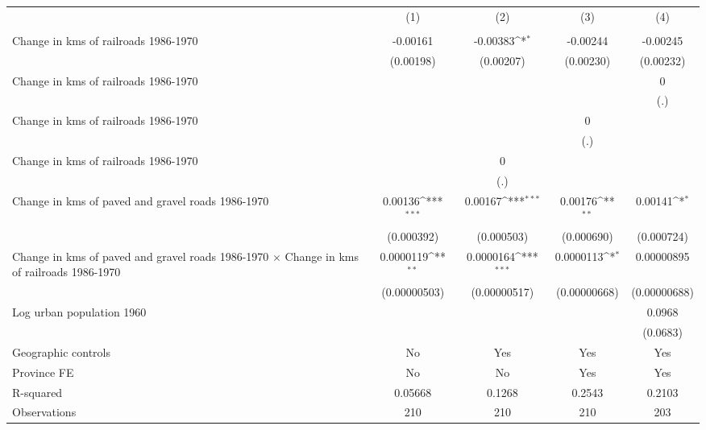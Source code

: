 {
\def\sym#1{\ifmmode^{#1}\else\(^{#1}\)\fi}
\begin{tabular}{l*{4}{c}}
\hline\hline
                &\multicolumn{1}{c}{(1)}&\multicolumn{1}{c}{(2)}&\multicolumn{1}{c}{(3)}&\multicolumn{1}{c}{(4)}\\
                &\multicolumn{1}{c}{}&\multicolumn{1}{c}{}&\multicolumn{1}{c}{}&\multicolumn{1}{c}{}\\
\hline
Change in kms of railroads 1986-1970& -0.00161         & -0.00383\sym{*}  & -0.00244         & -0.00245         \\
                &(0.00198)         &(0.00207)         &(0.00230)         &(0.00232)         \\
[1em]
Change in kms of railroads 1986-1970&                  &                  &                  &        0         \\
                &                  &                  &                  &      (.)         \\
[1em]
Change in kms of railroads 1986-1970&                  &                  &        0         &                  \\
                &                  &                  &      (.)         &                  \\
[1em]
Change in kms of railroads 1986-1970&                  &        0         &                  &                  \\
                &                  &      (.)         &                  &                  \\
[1em]
Change in kms of paved and gravel roads 1986-1970&  0.00136\sym{***}&  0.00167\sym{***}&  0.00176\sym{**} &  0.00141\sym{*}  \\
                &(0.000392)         &(0.000503)         &(0.000690)         &(0.000724)         \\
[1em]
Change in kms of paved and gravel roads 1986-1970 $\times$ Change in kms of railroads 1986-1970&0.0000119\sym{**} &0.0000164\sym{***}&0.0000113\sym{*}  &0.00000895         \\
                &(0.00000503)         &(0.00000517)         &(0.00000668)         &(0.00000688)         \\
[1em]
Log urban population 1960&                  &                  &                  &   0.0968         \\
                &                  &                  &                  & (0.0683)         \\
\hline
Geographic controls&       No         &      Yes         &      Yes         &      Yes         \\
Province FE     &       No         &       No         &      Yes         &      Yes         \\
R-squared       &  0.05668         &   0.1268         &   0.2543         &   0.2103         \\
Observations    &      210         &      210         &      210         &      203         \\
\hline\hline
\end{tabular}
}
